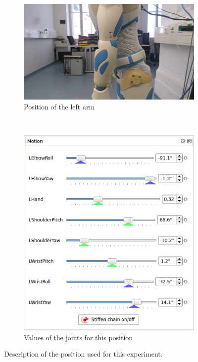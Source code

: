 \documentclass[12pt,a4paper,final,twoside,openright]{report}
\begin{document}
\begin{figure}[h]
\centering
\begin{subfigure}[r]{0.50\textwidth}
		\includegraphics[width=\textwidth]{images/DSC_0002.JPG}
        \caption{Position of the left arm}
\end{subfigure}
~
\begin{subfigure}[r]{0.40\textwidth}
		\includegraphics[width=\textwidth]{images/initial_pose.png}
        \caption{Values of the joints for this position}
\end{subfigure}
\caption{Description of the position used for this experiment.\label{fig:exp_visual_camera_initial_pos}}
\end{figure}
\end{document}
